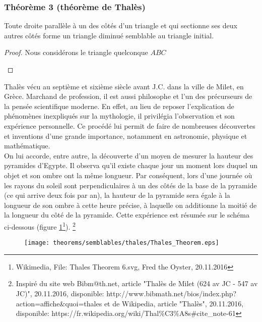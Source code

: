 \documentclass[a4paper,12pt]{article}
\begin{document}
\pagebreak
\subsubsection{Théorème 3 (théorème de Thalès)}
\begin{theorem}
Toute droite parallèle à un des côtés d'un triangle et qui sectionne ses deux autres côtés forme un triangle diminué semblable au triangle initial.
\end{theorem}

\begin{proof}
Nous considérons le triangle quelconque $ABC$ 
\begin{hyp}

\end{hyp}
\begin{concl}

\end{concl}


\end{proof}





\begin{remark}
Thalès vécu au septième et sixième siècle avant J.C. dans la ville de Milet, en Grèce. Marchand de profession, il est aussi philosophe et l'un des précurseurs de la pensée scientifique moderne. En effet, au lieu de reposer l'explication de phénomènes inexpliqués sur la mythologie, il privilégia l'observation et son expérience personnelle. Ce procédé lui permit de faire de nombreuses découvertes et inventions d'une grande importance, notamment en astronomie, physique et mathématique.\\

On lui accorde, entre autre, la découverte d'un moyen de mesurer la hauteur des pyramides d'Egypte. Il observa qu'il existe chaque jour un moment lors duquel un objet et son ombre ont la même longueur. Par conséquent, lors d'une journée où les rayons du soleil sont perpendiculaires à un des côtés de la base de la pyramide (ce qui arrive deux fois par an), la hauteur de la pyramide sera égale à la longueur de son ombre à cette heure précise, à laquelle on additionne la moitié de la longueur du côté de la pyramide. Cette expérience est résumée sur le schéma ci-dessous (figure \ref{fig:thales}\footnote{Wikimedia, File: Thales Theorem 6.svg, Fred the Oyster, 20.11.2016}).
\footnote{Inspiré du site web Bibm@th.net, article "Thalès de Milet (624 av JC - 547 av JC)", 20.11.2016, disponible:
http://www.bibmath.net/bios/index.php?action=affiche\&quoi=thales et de Wikipedia, article "Thalès", 20.11.2016, disponible: https://fr.wikipedia.org/wiki/Thal\%C3\%A8s\#cite\_note-61}


\begin{figure}[H]
    \centering
    \texttt{[image: theorems/semblables/thales/Thales\_Theorem.eps]}
    
    \caption{}
    \label{fig:thales}
\end{figure}
\end{remark}
\end{document}
